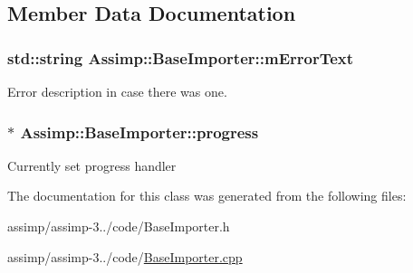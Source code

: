 \subsection{Member Data Documentation}
\hypertarget{class_assimp_1_1_base_importer_a7531969813de75ee5ae2f6be245abfb8}{
\subsubsection[{m\+Error\+Text}]{\setlength{\rightskip}{0pt plus 5cm}std\+::string Assimp\+::\+Base\+Importer\+::m\+Error\+Text\hspace{0.3cm}{\ttfamily [protected]}}}\label{class_assimp_1_1_base_importer_a7531969813de75ee5ae2f6be245abfb8}
Error description in case there was one. \hypertarget{class_assimp_1_1_base_importer_addeaa8583012cf1727194710321ca02b}{
\subsubsection[{progress}]{$\ast$ Assimp\+::\+Base\+Importer\+::progress\hspace{0.3cm}{\ttfamily [protected]}}}\label{class_assimp_1_1_base_importer_addeaa8583012cf1727194710321ca02b}
Currently set progress handler 

The documentation for this class was generated from the following files\+:\begin{DoxyCompactItemize}
\item 
assimp/assimp-\/3../code/Base\+Importer.\+h\item 
assimp/assimp-\/3../code/\hyperlink{_base_importer_8cpp}{Base\+Importer.\+cpp}\end{DoxyCompactItemize}
